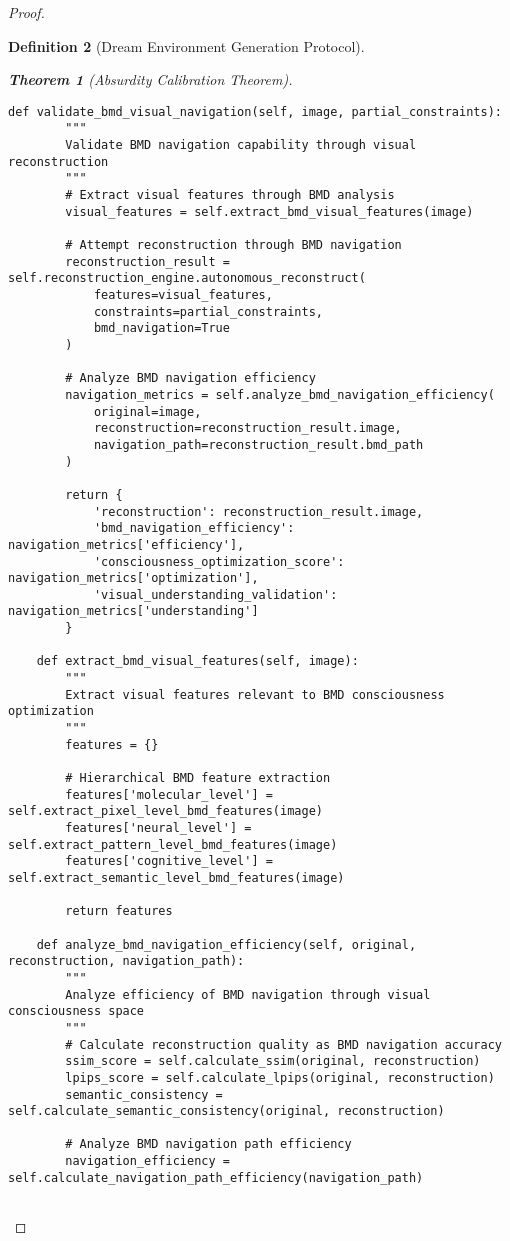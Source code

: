 \documentclass[12pt,a4paper]{article}
\newtheorem{theorem}{Theorem}[section]
\newtheorem{definition}[theorem]{Definition}
\begin{document}
\begin{proof}
\begin{definition}[Dream Environment Generation Protocol]
\begin{theorem}[Absurdity Calibration Theorem]
\begin{lstlisting}[style=pythonstyle, caption=BMD Navigation Validation Through Visual Reconstruction]
    def validate_bmd_visual_navigation(self, image, partial_constraints):
        """
        Validate BMD navigation capability through visual reconstruction
        """
        # Extract visual features through BMD analysis
        visual_features = self.extract_bmd_visual_features(image)
        
        # Attempt reconstruction through BMD navigation
        reconstruction_result = self.reconstruction_engine.autonomous_reconstruct(
            features=visual_features,
            constraints=partial_constraints,
            bmd_navigation=True
        )
        
        # Analyze BMD navigation efficiency
        navigation_metrics = self.analyze_bmd_navigation_efficiency(
            original=image,
            reconstruction=reconstruction_result.image,
            navigation_path=reconstruction_result.bmd_path
        )
        
        return {
            'reconstruction': reconstruction_result.image,
            'bmd_navigation_efficiency': navigation_metrics['efficiency'],
            'consciousness_optimization_score': navigation_metrics['optimization'],
            'visual_understanding_validation': navigation_metrics['understanding']
        }
    
    def extract_bmd_visual_features(self, image):
        """
        Extract visual features relevant to BMD consciousness optimization
        """
        features = {}
        
        # Hierarchical BMD feature extraction
        features['molecular_level'] = self.extract_pixel_level_bmd_features(image)
        features['neural_level'] = self.extract_pattern_level_bmd_features(image)
        features['cognitive_level'] = self.extract_semantic_level_bmd_features(image)
        
        return features
    
    def analyze_bmd_navigation_efficiency(self, original, reconstruction, navigation_path):
        """
        Analyze efficiency of BMD navigation through visual consciousness space
        """
        # Calculate reconstruction quality as BMD navigation accuracy
        ssim_score = self.calculate_ssim(original, reconstruction)
        lpips_score = self.calculate_lpips(original, reconstruction)
        semantic_consistency = self.calculate_semantic_consistency(original, reconstruction)
        
        # Analyze BMD navigation path efficiency
        navigation_efficiency = self.calculate_navigation_path_efficiency(navigation_path)
        

\end{lstlisting}
\end{theorem}
\end{definition}
\end{proof}
\end{document}
